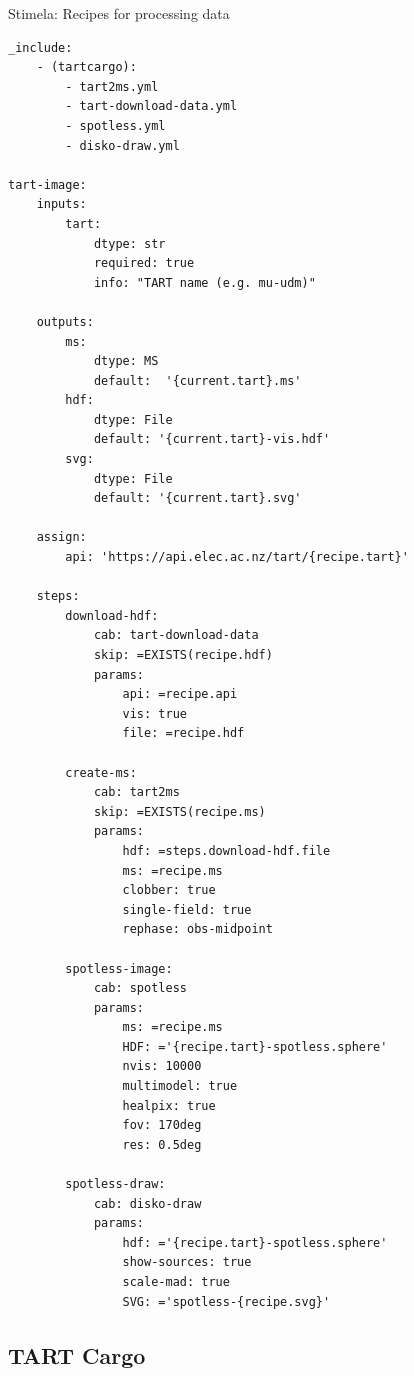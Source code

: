 \documentclass[ignorenonframetext]{beamer}
\begin{document}
\begin{frame}[fragile]{Stimela: Recipes for processing data}

\begin{lstlisting}[style=yaml]
_include:
    - (tartcargo):
        - tart2ms.yml
        - tart-download-data.yml
        - spotless.yml
        - disko-draw.yml

tart-image:
    inputs:
        tart:
            dtype: str
            required: true
            info: "TART name (e.g. mu-udm)"

    outputs:
        ms:
            dtype: MS
            default:  '{current.tart}.ms'
        hdf:
            dtype: File
            default: '{current.tart}-vis.hdf'
        svg:
            dtype: File
            default: '{current.tart}.svg'

    assign:
        api: 'https://api.elec.ac.nz/tart/{recipe.tart}'

    steps:
        download-hdf:
            cab: tart-download-data
            skip: =EXISTS(recipe.hdf)
            params:
                api: =recipe.api
                vis: true
                file: =recipe.hdf

        create-ms:
            cab: tart2ms
            skip: =EXISTS(recipe.ms)
            params:
                hdf: =steps.download-hdf.file
                ms: =recipe.ms
                clobber: true
                single-field: true
                rephase: obs-midpoint

        spotless-image:
            cab: spotless
            params:
                ms: =recipe.ms
                HDF: ='{recipe.tart}-spotless.sphere'
                nvis: 10000
                multimodel: true
                healpix: true
                fov: 170deg
                res: 0.5deg

        spotless-draw:
            cab: disko-draw
            params:
                hdf: ='{recipe.tart}-spotless.sphere'
                show-sources: true
                scale-mad: true
                SVG: ='spotless-{recipe.svg}'
\end{lstlisting}
\end{frame}
\subsection{TART Cargo}
\end{document}
